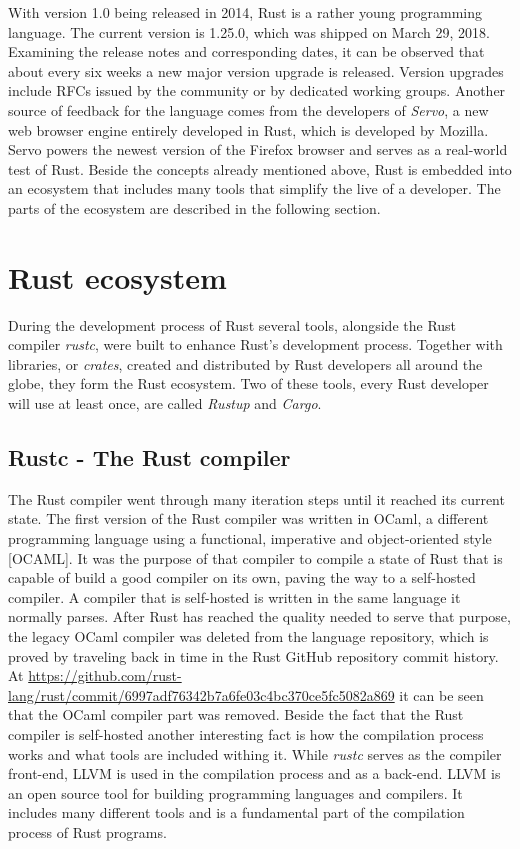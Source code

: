 With version 1.0 being released in 2014, Rust is a rather young programming language. The current version is 1.25.0, which was shipped on March 29, 2018. Examining the release notes and corresponding dates, it can be observed that about every six weeks a new major version upgrade is released. Version upgrades include \acp{RFC} issued by the community or by dedicated working groups. Another source of feedback for the language comes from the developers of \textit{Servo}, a new web browser engine entirely developed in Rust, which is developed by Mozilla. Servo powers the newest version of the Firefox browser and serves as a real-world test of Rust. Beside the concepts already mentioned above, Rust is embedded into an ecosystem that includes many tools that simplify the live of a developer. The parts of the ecosystem are described in the following section.

\section{Rust ecosystem}

During the development process of Rust several tools, alongside the Rust compiler \textit{rustc}, were built to enhance Rust's development process. Together with libraries, or \textit{crates}, created and distributed by Rust developers all around the globe, they form the Rust ecosystem. Two of these tools, every Rust developer will use at least once, are called \textit{Rustup} and \textit{Cargo}. 

\subsection{Rustc - The Rust compiler}

The Rust compiler went through many iteration steps until it reached its current state. The first version of the Rust compiler was written in OCaml, a different programming language using a functional, imperative and object-oriented style [OCAML]. It was the purpose of that compiler to compile a state of Rust that is capable of build a good compiler on its own, paving the way to a self-hosted compiler. A compiler that is self-hosted is written in the same language it normally parses. After Rust has reached the quality needed to serve that purpose, the legacy OCaml compiler was deleted from the language repository, which is proved by traveling back in time in the Rust GitHub repository commit history. At \url{https://github.com/rust-lang/rust/commit/6997adf76342b7a6fe03c4bc370ce5fc5082a869} it can be seen that the OCaml compiler part was removed. Beside the fact that the Rust compiler is self-hosted another interesting fact is how the compilation process works and what tools are included withing it. While \textit{rustc} serves as the compiler front-end, \ac{LLVM} is used in the compilation process and as a back-end. \ac{LLVM} is an open source tool for building programming languages and compilers. It includes many different tools and is a fundamental part of the compilation process of Rust programs.

